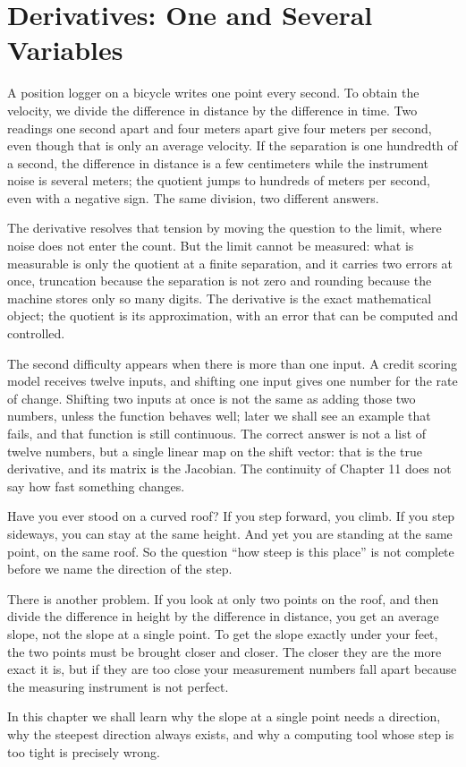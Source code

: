 \chapter{Derivatives: One and Several Variables}

A position logger on a bicycle writes one point every second. To obtain the velocity, we
divide the difference in distance by the difference in time. Two readings one second apart
and four meters apart give four meters per second, even though that is only an average
velocity. If the separation is one hundredth of a second, the difference in distance is a few
centimeters while the instrument noise is several meters; the quotient jumps to hundreds of
meters per second, even with a negative sign. The same division, two different answers.

The derivative resolves that tension by moving the question to the limit, where noise does not
enter the count. But the limit cannot be measured: what is measurable is only the quotient at
a finite separation, and it carries two errors at once, truncation because the separation is
not zero and rounding because the machine stores only so many digits. The derivative is the
exact mathematical object; the quotient is its approximation, with an error that can be
computed and controlled.

The second difficulty appears when there is more than one input. A credit scoring model
receives twelve inputs, and shifting one input gives one number for the rate of change.
Shifting two inputs at once is not the same as adding those two numbers, unless the function
behaves well; later we shall see an example that fails, and that function is still
continuous. The correct answer is not a list of twelve numbers, but a single linear map on the
shift vector: that is the true derivative, and its matrix is the Jacobian. The continuity of
Chapter 11 does not say how fast something changes.

\begin{untukanak}
Have you ever stood on a curved roof? If you step forward, you climb. If you step sideways,
you can stay at the same height. And yet you are standing at the same point, on the same roof.
So the question ``how steep is this place'' is not complete before we name the direction of
the step.

There is another problem. If you look at only two points on the roof, and then divide the
difference in height by the difference in distance, you get an average slope, not the slope at
a single point. To get the slope exactly under your feet, the two points must be brought
closer and closer. The closer they are the more exact it is, but if they are too close your
measurement numbers fall apart because the measuring instrument is not perfect.

In this chapter we shall learn why the slope at a single point needs a direction, why the
steepest direction always exists, and why a computing tool whose step is too tight is
precisely wrong.
\end{untukanak}

